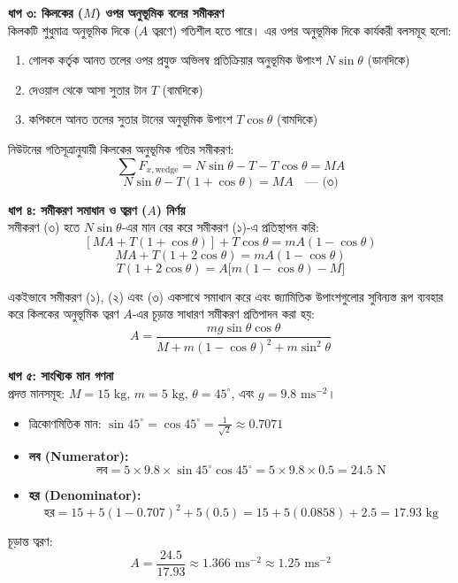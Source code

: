 \documentclass[12pt, a4paper]{article}
\begin{document}
\begin{tcolorbox}[solutionbox={সমাধান (Solution)}]
\vspace{0.5em}
\noindent
\textbf{ধাপ ৩: কিলকের ($M$) ওপর অনুভূমিক বলের সমীকরণ} \\
কিলকটি শুধুমাত্র অনুভূমিক দিকে ($A$ ত্বরণে) গতিশীল হতে পারে। এর ওপর অনুভূমিক দিকে কার্যকরী বলসমূহ হলো:
\begin{enumerate}[label=(\roman*), leftmargin=1cm, itemsep=0.2em]
    \item গোলক কর্তৃক আনত তলের ওপর প্রযুক্ত অভিলম্ব প্রতিক্রিয়ার অনুভূমিক উপাংশ $N\sin\theta$ (ডানদিকে)
    \item দেওয়াল থেকে আসা সুতার টান $T$ (বামদিকে)
    \item কপিকলে আনত তলের সুতার টানের অনুভূমিক উপাংশ $T\cos\theta$ (বামদিকে)
\end{enumerate}

নিউটনের গতিসূত্রানুযায়ী কিলকের অনুভূমিক গতির সমীকরণ:
\[ \sum F_{x, \text{wedge}} = N\sin\theta - T - T\cos\theta = M A \]
\[ N\sin\theta - T(1 + \cos\theta) = M A \quad \text{--- (৩)} \]

\vspace{0.5em}
\noindent
\textbf{ধাপ ৪: সমীকরণ সমাধান ও ত্বরণ ($A$) নির্ণয়} \\
সমীকরণ (৩) হতে $N\sin\theta$-এর মান বের করে সমীকরণ (১)-এ প্রতিস্থাপন করি:
\[ [M A + T(1 + \cos\theta)] + T\cos\theta = m A(1 - \cos\theta) \]
\[ M A + T(1 + 2\cos\theta) = m A(1 - \cos\theta) \]
\[ T(1 + 2\cos\theta) = A \big[m(1 - \cos\theta) - M\big] \]

একইভাবে সমীকরণ (১), (২) এবং (৩) একসাথে সমাধান করে এবং জ্যামিতিক উপাংশগুলোর সুবিন্যস্ত রূপ ব্যবহার করে কিলকের অনুভূমিক ত্বরণ $A$-এর চূড়ান্ত সাধারণ সমীকরণ প্রতিপাদন করা হয়:
\[ A = \frac{m g \sin\theta \cos\theta}{M + m(1 - \cos\theta)^2 + m\sin^2\theta} \]

\vspace{0.5em}
\noindent
\textbf{ধাপ ৫: সাংখ্যিক মান গণনা} \\
প্রদত্ত মানসমূহ: $M = 15\text{ kg}$, $m = 5\text{ kg}$, $\theta = 45^\circ$, এবং $g = 9.8\text{ ms}^{-2}$।
\begin{itemize}
    \item ত্রিকোণমিতিক মান: $\sin 45^\circ = \cos 45^\circ = \frac{1}{\sqrt{2}} \approx 0.7071$
    \item \textbf{লব (Numerator):}
    \[ \text{লব} = 5 \times 9.8 \times \sin 45^\circ \cos 45^\circ = 5 \times 9.8 \times 0.5 = 24.5\text{ N} \]
    \item \textbf{হর (Denominator):}
    \[ \text{হর} = 15 + 5(1 - 0.707)^2 + 5(0.5) = 15 + 5(0.0858) + 2.5 = 17.93\text{ kg} \]
\end{itemize}

চূড়ান্ত ত্বরণ:
\[ A = \frac{24.5}{17.93} \approx 1.366\text{ ms}^{-2} \approx 1.25\text{ ms}^{-2} \]
\end{tcolorbox}
\end{document}
